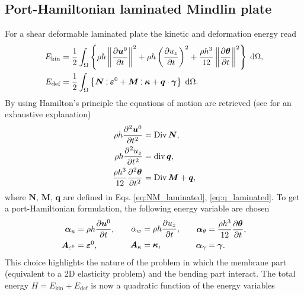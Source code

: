\subsection{Port-Hamiltonian laminated Mindlin plate}
For a shear deformable laminated plate the kinetic and deformation energy read
\begin{equation*}
\begin{aligned}
E_{\text{kin}} &= \energy{\rho h \norm{\diffp{\bm{u}^0}{t}}^2 + \rho h \left(\diffp{u_z}{t}\right)^2 + \frac{\rho h^3}{12} \norm{\diffp{\bm{\theta}}{t}}^2}, \\
E_{\text{def}} &= \energy{\bm{N} \cddot \bm{\varepsilon}^0 + \bm{M} \cddot \bm{\kappa} + \bm{q} \cdot \bm{\gamma}}. 
\end{aligned}
\end{equation*}
By using Hamilton's principle the equations of motion are retrieved (see \cite[Chapter~3]{reddy2003mechanics} for an exhaustive explanation)
\begin{equation}\label{eq:sysLamMin}
	\begin{aligned}
	\rho h \diffp[2]{\bm{u}^0}{t} &= \Div \bm{N}, \\
	\rho h \diffp[2]{{u}_z}{t} &= \div \bm{q}, \\
	\frac{\rho h^3}{12}\diffp[2]{\bm{\theta}}{t} &= \Div \bm{M} + \bm{q}, \\
	\end{aligned}	
\end{equation}
where $\bm{N}, \, \bm{M}, \, \bm{q}$ are defined in Eqs. \eqref{eq:NM_laminated}, \eqref{eq:q_laminated}. 
To get a port-Hamiltonian formulation, the following energy variable are chosen
\begin{equation}
	\begin{aligned}
	\bm{\alpha}_u &= \rho h \diffp{\bm{u}^0}{t}, \\
	\bm{A}_{\varepsilon^0} &= \bm{\varepsilon}^0,
	\end{aligned} \qquad
	\begin{aligned}
	{\alpha}_w &= \rho h \diffp{{u}_z}{t}, \\
	\bm{A}_{\kappa} &= \bm{\kappa},
	\end{aligned} \qquad
	\begin{aligned}
	\bm{\alpha}_\theta &= \frac{\rho h^3}{12} \diffp{\bm{\theta}}{t}, \\
	\bm{\alpha}_{\gamma} &= \bm{\gamma}.
	\end{aligned}
\end{equation} 
This choice highlights the nature of the problem in which the membrane part (equivalent to a 2D elasticity problem) and the bending part interact. The total energy $H=E_{\text{kin}} + E_{\text{def}}$ is now a quadratic function of the energy variables
